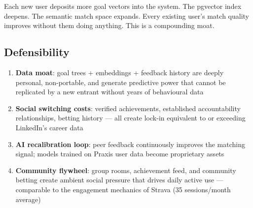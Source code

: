 \documentclass[11pt,a4paper]{article}
\begin{document}
\begin{center}
\end{center}

Each new user deposits more goal vectors into the system. The pgvector index deepens. The semantic match space expands. Every existing user's match quality improves without them doing anything. This is a compounding moat.

\subsection{Defensibility}

\begin{enumerate}
  \item \textbf{Data moat}: goal trees + embeddings + feedback history are deeply personal, non-portable, and generate predictive power that cannot be replicated by a new entrant without years of behavioural data
  \item \textbf{Social switching costs}: verified achievements, established accountability relationships, betting history — all create lock-in equivalent to or exceeding LinkedIn's career data
  \item \textbf{AI recalibration loop}: peer feedback continuously improves the matching signal; models trained on Praxis user data become proprietary assets
  \item \textbf{Community flywheel}: group rooms, achievement feed, and community betting create ambient social pressure that drives daily active use — comparable to the engagement mechanics of Strava (35 sessions/month average)
\end{enumerate}
\end{document}
